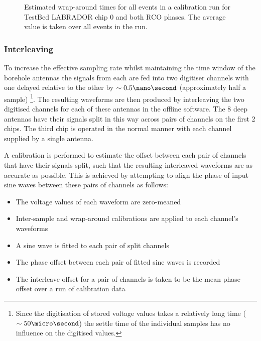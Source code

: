 \begin{figure}[htpb]
  \hfill
  \caption{Estimated wrap-around times for all events in a calibration run for TestBed LABRADOR chip 0 and both RCO phases. The average value is taken over all events in the run.}
  \label{fig:calibration:LABRADOR-Digitiser-Chip:Wrap-around}
\end{figure}


\subsubsection{Interleaving}
\label{sec:calibration:LABRADOR-Digitiser-Chip:Interleaving}

To increase the effective sampling rate whilst maintaining the time window of the borehole antennas the signals from each are fed into two digitiser channels with one delayed relative to the other by $\sim 0.5 \nano \second$ (approximately half a sample) \footnote{Since the digitisation of stored voltage values takes a relatively long time ($\sim 50 \micro \second$) the settle time of the individual samples has no influence on the digitised values.}. The resulting waveforms are then produced by interleaving the two digitised channels for each of these antennas in the offline software. The 8 deep antennas have their signals split in this way across pairs of channels on the first 2 chips. The third chip is operated in the normal manner with each channel supplied by a single antenna.

A calibration is performed to estimate the offset between each pair of channels that have their signals split, such that the resulting interleaved waveforms are as accurate as possible. This is achieved by attempting to align the phase of input sine waves between these pairs of channels as follows:

\begin{itemize}
\item The voltage values of each waveform are zero-meaned
\item Inter-sample and wrap-around calibrations are applied to each channel's waveforms
\item A sine wave is fitted to each pair of split channels
\item The phase offset between each pair of fitted sine waves is recorded
\item The interleave offset for a pair of channels is taken to be the mean phase offset over a run of calibration data
\end{itemize}

